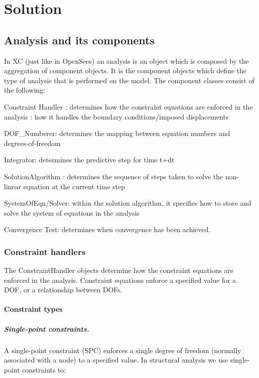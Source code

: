 \chapter{Solution}

\section{Analysis and its components}

In XC (just like in OpenSees) an analysis is an object which is composed by the aggregation of component objects. It is the component objects which define the type of analysis that is performed on the model. The component classes consist of the following:

\begin{description}
\item{Constraint Handler} : determines how the constraint equations are enforced in the analysis : how it handles the boundary conditions/imposed displacements
\item{DOF\_Numberer}: determines the mapping between equation numbers and degrees-of-freedom
\item{Integrator}: determines the predictive step for time t+dt
\item{SolutionAlgorithm} : determines the sequence of steps taken to solve the non-linear equation at the current time step
\item{SystemOfEqn/Solver}: within the solution algorithm, it specifies how to store and solve the system of equations in the analysis
\item{Convergence Test}: determines when convergence has been achieved. 
\end{description}

\subsection{Constraint handlers}
The ConstraintHandler objects determine how the constraint equations are enforced in the analysis. Constraint equations enforce a specified value for a DOF, or a relationship between DOFs.

\subsubsection{Constraint types}

\paragraph{Single-point constraints.}
A single-point constraint (SPC) enforces a single degree of freedom (normally associated with a node) to a specified value. In structural analysis we use single-point constraints to:


